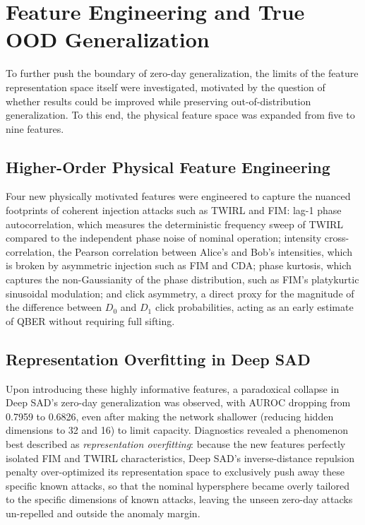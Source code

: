 \documentclass[12pt, a4paper]{report}
\begin{document}
\chapter{Feature Engineering and True OOD Generalization}\label{ch:phase4}

To further push the boundary of zero-day generalization, the limits of the feature representation space itself were investigated, motivated by the question of whether results could be improved while preserving out-of-distribution generalization. To this end, the physical feature space was expanded from five to nine features.

\section{Higher-Order Physical Feature Engineering}
Four new physically motivated features were engineered to capture the nuanced footprints of coherent injection attacks such as TWIRL and FIM: lag-1 phase autocorrelation, which measures the deterministic frequency sweep of TWIRL compared to the independent phase noise of nominal operation; intensity cross-correlation, the Pearson correlation between Alice's and Bob's intensities, which is broken by asymmetric injection such as FIM and CDA; phase kurtosis, which captures the non-Gaussianity of the phase distribution, such as FIM's platykurtic sinusoidal modulation; and click asymmetry, a direct proxy for the magnitude of the difference between $D_0$ and $D_1$ click probabilities, acting as an early estimate of QBER without requiring full sifting.

\section{Representation Overfitting in Deep SAD}
Upon introducing these highly informative features, a paradoxical collapse in Deep SAD's zero-day generalization was observed, with AUROC dropping from 0.7959 to 0.6826, even after making the network shallower (reducing hidden dimensions to 32 and 16) to limit capacity. Diagnostics revealed a phenomenon best described as \emph{representation overfitting}: because the new features perfectly isolated FIM and TWIRL characteristics, Deep SAD's inverse-distance repulsion penalty over-optimized its representation space to exclusively push away these specific known attacks, so that the nominal hypersphere became overly tailored to the specific dimensions of known attacks, leaving the unseen zero-day attacks un-repelled and outside the anomaly margin.
\end{document}

